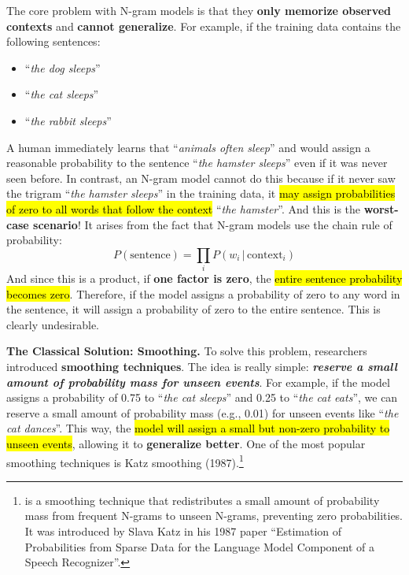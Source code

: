 \highspace
The core problem with N-gram models is that they \textbf{only memorize observed contexts} and \textbf{cannot generalize}. For example, if the training data contains the following sentences:
\begin{itemize}
    \item ``\emph{the dog sleeps}''
    \item ``\emph{the cat sleeps}''
    \item ``\emph{the rabbit sleeps}''
\end{itemize}
A human immediately learns that ``\emph{animals often sleep}'' and would assign a reasonable probability to the sentence ``\emph{the hamster sleeps}'' even if it was never seen before. In contrast, an N-gram model cannot do this because if it never saw the trigram ``\emph{the hamster sleeps}'' in the training data, it \hl{may assign probabilities of zero to all words that follow the context} ``\emph{the hamster}''. And this is the \textbf{worst-case scenario}! It arises from the fact that N-gram models use the chain rule of probability:
\begin{equation*}
    P\left(\text{sentence}\right) = \prod_{i} P\left(w_{i} \, | \, \text{context}_{i}\right)
\end{equation*}
And since this is a product, if \textbf{one factor is zero}, the \hl{entire sentence probability becomes zero}. Therefore, if the model assigns a probability of zero to any word in the sentence, it will assign a probability of zero to the entire sentence. This is clearly undesirable.

\highspace
\textcolor{Green3}{ \textbf{The Classical Solution: Smoothing.}} To solve this problem, researchers introduced \textbf{smoothing techniques}. The idea is really simple: \emph{\textbf{reserve a small amount of probability mass for unseen events}}. For example, if the model assigns a probability of 0.75 to ``\emph{the cat sleeps}'' and 0.25 to ``\emph{the cat eats}'', we can reserve a small amount of probability mass (e.g., 0.01) for unseen events like ``\emph{the cat dances}''. This way, the \hl{model will assign a small but non-zero probability to unseen events}, allowing it to \textbf{generalize better}. One of the most popular smoothing techniques is Katz smoothing (1987).\footnote{ is a smoothing technique that redistributes a small amount of probability mass from frequent N-grams to unseen N-grams, preventing zero probabilities. It was introduced by Slava Katz in his 1987 paper ``Estimation of Probabilities from Sparse Data for the Language Model Component of a Speech Recognizer''.\cite{katz1987estimation}}